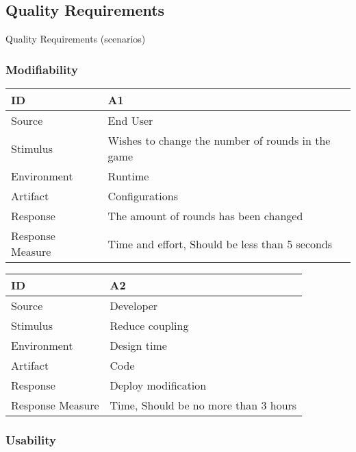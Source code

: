 \subsection{Quality Requirements}

Quality Requirements (scenarios)

\subsubsection{Modifiability}

\begin{center}
	\begin{tabular}{ | l | p{12cm} |}
	\hline

	ID & A1 \\ \hline
	Source & End User \\ \hline
	Stimulus & Wishes to change the number of rounds in the game \\ \hline
	Environment & Runtime \\ \hline
	Artifact & Configurations \\ \hline
	Response & The amount of rounds has been changed \\ \hline
	Response Measure & Time and effort, Should be less than 5 seconds \\ \hline

	\hline
	\end{tabular}
\end{center}

\begin{center}
	\begin{tabular}{ | l | p{12cm} |}
	\hline

	ID & A2 \\ \hline
	Source & Developer \\ \hline
	Stimulus & Reduce coupling \\ \hline
	Environment & Design time \\ \hline
	Artifact & Code \\ \hline
	Response & Deploy modification \\ \hline
	Response Measure & Time, Should be no more than 3 hours \\ \hline
	\hline
	\end{tabular}
\end{center}

\subsubsection{Usability}

